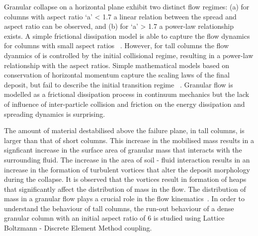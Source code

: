 \documentclass[epj,twocolumn]{webofc}
\begin{document}
Granular collapse on a horizontal plane exhibit two distinct flow regimes:
(a) for columns with aspect ratio ‘a’ < 1.7 a linear relation between the
spread and aspect ratio can be observed, and (b) for ‘a’ > 1.7 a power-law
relationship exists. A simple frictional dissipation model is able to
capture the flow dynamics for columns with small aspect ratios
~\cite{soundararajan2015}. However, for tall columns the flow
dyanmics of is controlled by the initial collisional regime, resulting in a
power-law relationship with the aspect ratios. Simple mathematical models
based on conservation of horizontal momentum capture the scaling laws of
the final deposit, but fail to describe the initial transition regime
~\citep{Kumar2012}. Granular flow is modelled as a frictional dissipation
process in continuum mechanics but the lack of influence of inter-particle
collision and friction on the energy dissipation and spreading dynamics is
surprising.

The amount of material destabilised above the failure plane, in tall columns,
is larger than that of short columns. This increase in the mobilised mass
results in a signficant increase in the surface area of granular mass that
interacts with the surrounding fluid. The increase in the area of soil -
fluid interaction results in an increase
in the formation of turbulent vortices that alter the deposit morphology during 
the collapse. It is observed that the vortices result in formation of heaps 
that significantly affect the distribution of mass in the flow.
The distribution of mass in a granular flow plays a crucial role in the
flow kinematics~\cite{Staron2007a}. In order to understand the
behaviour of tall columns, the run-out behaviour of a dense granular column
with an initial aspect ratio of 6 is studied using Lattice Boltzmann - Discrete
Element Method coupling.
\end{document}
